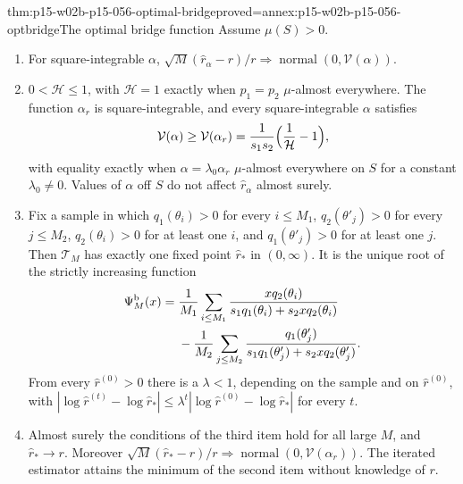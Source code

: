 \begin{hbtheorem}{thm:p15-w02b-p15-056-optimal-bridge}{proved=annex:p15-w02b-p15-056-optbridge}{The optimal bridge function}
Assume \(\mu(S)>0\).
\begin{enumerate}
\item For square-integrable \(\alpha\),
\(\sqrt M(\widehat r_\alpha-r)/r\Rightarrow
\operatorname{normal}(0,\mathcal V(\alpha))\).
\item \(0<\mathcal H\leq1\), with \(\mathcal H=1\) exactly when
\(p_1=p_2\) \(\mu\)-almost everywhere. The function \(\alpha_r\) is
square-integrable, and every square-integrable \(\alpha\) satisfies
\[
 \mathcal V(\alpha)\geq\mathcal V(\alpha_r)
 =\frac1{s_1s_2}\Bigl(\frac1{\mathcal H}-1\Bigr),
\]
with equality exactly when \(\alpha=\lambda_0\alpha_r\) \(\mu\)-almost
everywhere on \(S\) for a constant \(\lambda_0\neq0\). Values of \(\alpha\)
off \(S\) do not affect \(\widehat r_\alpha\) almost surely.
\item Fix a sample in which \(q_1(\theta_i)>0\) for every \(i\leq M_1\),
\(q_2(\theta'_j)>0\) for every \(j\leq M_2\), \(q_2(\theta_i)>0\) for at
least one \(i\), and \(q_1(\theta'_j)>0\) for at least one \(j\). Then
\(\mathcal T_M\) has exactly one fixed point \(\widehat r_*\) in
\((0,\infty)\). It is the unique root of the strictly increasing function
\[
\begin{aligned}
 \Psi^{\rm b}_M(x)={}&\frac1{M_1}\sum_{i\leq M_1}
 \frac{xq_2(\theta_i)}{s_1q_1(\theta_i)+s_2xq_2(\theta_i)}\\
 &-\frac1{M_2}\sum_{j\leq M_2}
 \frac{q_1(\theta'_j)}{s_1q_1(\theta'_j)+s_2xq_2(\theta'_j)} .
\end{aligned}
\]
From every \(\widehat r^{(0)}>0\) there is a \(\lambda<1\), depending on
the sample and on \(\widehat r^{(0)}\), with
\(|\log\widehat r^{(t)}-\log\widehat r_*|
\leq\lambda^t|\log\widehat r^{(0)}-\log\widehat r_*|\) for every \(t\).
\item Almost surely the conditions of the third item hold for all large
\(M\), and \(\widehat r_*\to r\). Moreover
\(\sqrt M(\widehat r_*-r)/r\Rightarrow
\operatorname{normal}(0,\mathcal V(\alpha_r))\). The iterated estimator
attains the minimum of the second item without knowledge of \(r\).
\end{enumerate}
\end{hbtheorem}

